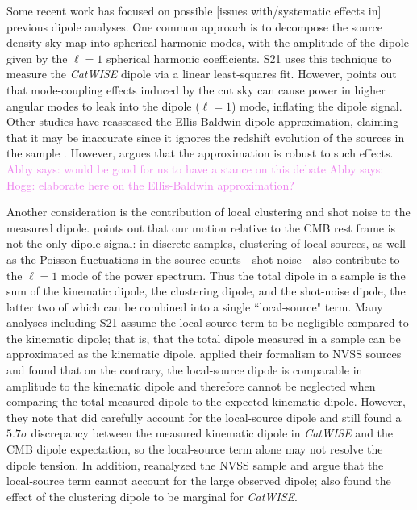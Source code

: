 \documentclass[modern]{aastex631}
\newcommand{\abby}[1]{\textcolor{violet}{Abby says: #1}}
\newcommand{\catwise}{\textsl{CatWISE}\xspace}
\begin{document}
Some recent work has focused on possible [issues with/systematic effects in] previous dipole analyses.
One common approach is to decompose the source density sky map into spherical harmonic modes, with the amplitude of the dipole given by the $\ell=1$ spherical harmonic coefficients.
S21 uses this technique to measure the \catwise dipole via a linear least-squares fit.
However, \citet{abghari_reassessment_2024} points out that mode-coupling effects induced by the cut sky can cause power in higher angular modes to leak into the dipole ($\ell=1$) mode, inflating the dipole signal.
Other studies have reassessed the Ellis-Baldwin dipole approximation, claiming that it may be inaccurate since it ignores the redshift evolution of the sources in the sample \citep{dalang_kinematic_2022, guandalin_theoretical_2022}.
However, \citet{von_hausegger_expected_2024} argues that the approximation is robust to such effects.
\abby{would be good for us to have a stance on this debate}
\abby{Hogg: elaborate here on the Ellis-Baldwin approximation?}

Another consideration is the contribution of local clustering and shot noise to the measured dipole.
\citet{cheng_is_2023} points out that our motion relative to the CMB rest frame is not the only dipole signal: in discrete samples, clustering of local sources, as well as the Poisson fluctuations in the source counts---shot noise---also contribute to the $\ell=1$ mode of the power spectrum.
Thus the total dipole in a sample is the sum of the kinematic dipole, the clustering dipole, and the shot-noise dipole, the latter two of which can be combined into a single ``local-source" term.
Many analyses including S21 assume the local-source term to be negligible compared to the kinematic dipole; that is, that the total dipole measured in a sample can be approximated as the kinematic dipole.
\citet{cheng_is_2023} applied their formalism to NVSS sources and found that on the contrary, the local-source dipole is comparable in amplitude to the kinematic dipole and therefore cannot be neglected when comparing the total measured dipole to the expected kinematic dipole.
However, they note that \citet{dam_testing_2022} did carefully account for the local-source dipole and still found a $5.7\sigma$ discrepancy between the measured kinematic dipole in \catwise and the CMB dipole expectation, so the local-source term alone may not resolve the dipole tension.
In addition, \citet{singal_cosmic_2024} reanalyzed the NVSS sample and argue that the local-source term cannot account for the large observed dipole; \cite{von_hausegger_clustering_2025} also found the effect of the clustering dipole to be marginal for \catwise.
\end{document}

